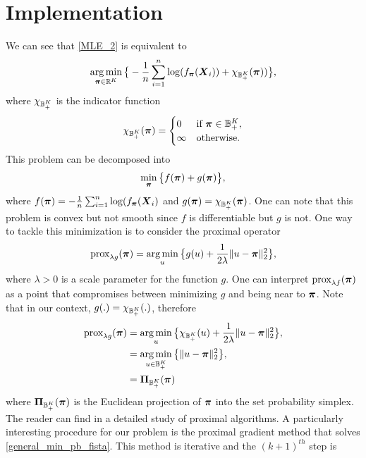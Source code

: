 \section{Implementation}
We can see that \cref{MLE_2} is equivalent to
\begin{equation}
\operatorname*{arg\,min}_{\boldsymbol \pi\in{\mathbb R}^K}\big\{-\frac{1}{n}\sum_{i=1}^n\log(f_{\boldsymbol \pi}(\boldsymbol X_i))+\chi_{{\mathbb B}_+^K}(\boldsymbol \pi))\big\},
\end{equation}
where $\chi_{{\mathbb B}_+^K}$ is the indicator function
\begin{equation*}
    \chi_{{\mathbb B}_+^K}(\boldsymbol \pi) =
    \begin{cases}
      0 & \text{if } \boldsymbol \pi\in {\mathbb B}_+^K,\\
      \infty & \text{otherwise} .
    \end{cases}
\end{equation*}
This problem can be decomposed into 
\begin{equation}
\label{general_min_pb_fista}
    \min_{\boldsymbol \pi}\big\{f(\boldsymbol \pi)+g(\boldsymbol \pi)\big\},
\end{equation}
where $f(\boldsymbol \pi) =-\frac{1}{n}\sum_{i=1}^n\log(f_{\boldsymbol \pi}(\boldsymbol X_i)$ and $g(\boldsymbol \pi)=\chi_{{\mathbb B}_+^K}(\boldsymbol \pi)$. One can note that this problem is convex but not smooth since $f$ is differentiable but $g$ is not. One way to tackle this minimization is to consider the proximal operator
\begin{equation}
    \textnormal{prox}_{\lambda g}(\boldsymbol \pi) = \operatorname*{arg\,min}_{u}\big\{g(u)+\frac{1}{2\lambda}\|u-\boldsymbol \pi\|^2_2\big\},
\end{equation}
where $\lambda > 0$ is a scale parameter for the function $g$. One can interpret $\textnormal{prox}_{\lambda f}(\boldsymbol \pi)$ as a point that compromises between minimizing $g$ and being near to $\boldsymbol \pi$. Note that in our context, $g(.)=\chi_{{\mathbb B}_+^K}(.)$, therefore
\begin{align*}
    \textnormal{prox}_{\lambda g}(\boldsymbol \pi) &= \operatorname*{arg\,min}_{u}\big\{\chi_{{\mathbb B}_+^K}(u)+\frac{1}{2\lambda}\|u-\boldsymbol \pi\|^2_2\big\},\\
    &= \operatorname*{arg\,min}_{u\in {\mathbb B}_+^K}\big\{\|u-\boldsymbol \pi\|^2_2\big\},\\
    &= \boldsymbol\Pi_{{\mathbb B}_+^K}(\boldsymbol \pi)
\end{align*}
where $\boldsymbol\Pi_{{\mathbb B}_+^K}(\boldsymbol \pi)$ is the Euclidean projection of $\boldsymbol \pi$ into the set probability simplex. The reader can find in \citep{Parikh:2014:PA:2693612.2693613} a detailed study of proximal algorithms. A particularly interesting procedure for our problem is the proximal gradient method that solves \cref{general_min_pb_fista}. This method is iterative and the $(k+1)^{th}$ step is
